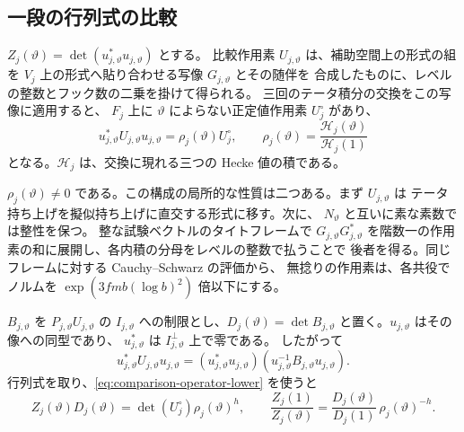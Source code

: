 

\subsection{一段の行列式の比較}

\(Z_j(\vartheta)=\det(u_{j,\vartheta}^*u_{j,\vartheta})\) とする。
比較作用素 \(U_{j,\vartheta}\) は、補助空間上の形式の組を
\(V_j\) 上の形式へ貼り合わせる写像 \(G_{j,\vartheta}\) とその随伴を
合成したものに、レベルの整数とフック数の二乗を掛けて得られる。
三回のテータ積分の交換をこの写像に適用すると、
\(F_j\) 上に \(\vartheta\) によらない正定値作用素 \(U_j^\circ\) があり、
\begin{equation}
 u_{j,\vartheta}^*U_{j,\vartheta}u_{j,\vartheta}
      =\rho_j(\vartheta)U_j^\circ,\qquad
 \rho_j(\vartheta)=
 \frac{\mathcal H_j(\vartheta)}{\mathcal H_j(1)}
 \label{eq:comparison-operator-lower}
\end{equation}
となる。\(\mathcal H_j\) は、交換に現れる三つの Hecke 値の積である。


\(\rho_j(\vartheta)\ne0\) である。この構成の局所的な性質は二つある。まず \(U_{j,\vartheta}\) は
テータ持ち上げを擬似持ち上げに直交する形式に移す。次に、
\(N_\vartheta\) と互いに素な素数では整性を保つ。
整な試験ベクトルのタイトフレームで \(G_{j,\vartheta}G_{j,\vartheta}^*\)
を階数一の作用素の和に展開し、各内積の分母をレベルの整数で払うことで
後者を得る。同じフレームに対する Cauchy--Schwarz の評価から、
無捻りの作用素は、各共役でノルムを
\(\exp(3fmb(\log b)^2)\) 倍以下にする。

\(B_{j,\vartheta}\) を \(P_{j,\vartheta} U_{j,\vartheta}\) の
\(I_{j,\vartheta}\) への制限とし、\(D_j(\vartheta)=\det B_{j,\vartheta}\)
と置く。\(u_{j,\vartheta}\) はその像への同型であり、
\(u_{j,\vartheta}^*\) は \(I_{j,\vartheta}^\perp\) 上で零である。
したがって
\[
 u_{j,\vartheta}^* U_{j,\vartheta} u_{j,\vartheta}
  =(u_{j,\vartheta}^*u_{j,\vartheta})
    (u_{j,\vartheta}^{-1} B_{j,\vartheta}u_{j,\vartheta}).
\]
行列式を取り、\eqref{eq:comparison-operator-lower} を使うと
\[
 Z_j(\vartheta)D_j(\vartheta)
      =\det(U_j^\circ)\rho_j(\vartheta)^h,\qquad
 \frac{Z_j(1)}{Z_j(\vartheta)}
   =\frac{D_j(\vartheta)}{D_j(1)}\,\rho_j(\vartheta)^{-h}.
\]


